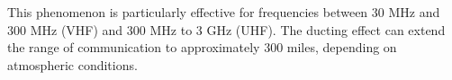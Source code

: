 This phenomenon is particularly effective for frequencies between 30 MHz and 300 MHz (VHF) and 300 MHz to 3 GHz (UHF). The ducting effect can extend the range of communication to approximately 300 miles, depending on atmospheric conditions.

